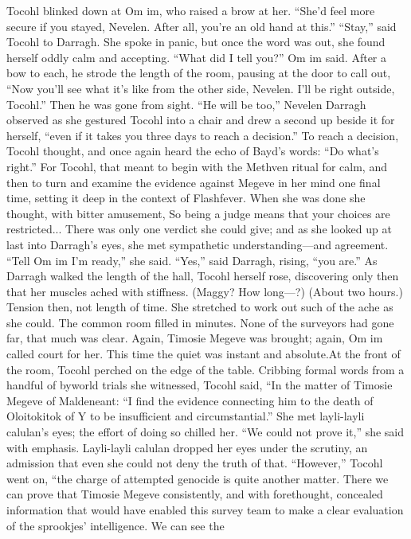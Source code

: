 \documentclass[9pt]{article}
\begin{document}
Tocohl blinked down at Om im, who raised a brow at her. “She’d feel more secure if you stayed,
Nevelen. After all, you’re an old hand at this.”
“Stay,” said Tocohl to Darragh. She spoke in panic, but once the word was out, she found herself
oddly calm and accepting.
“What did I tell you?” Om im said. After a bow to each, he strode the length of the room, pausing at
the door to call out, “Now you’ll see what it’s like from the other side, Nevelen. I’ll be right outside,
Tocohl.” Then he was gone from sight.
“He will be too,” Nevelen Darragh observed as she gestured Tocohl into a chair and drew a second
up beside it for herself, “even if it takes you three days to reach a decision.”
To reach a decision, Tocohl thought, and once again heard the echo of Bayd’s words: “Do what’s
right.”
For Tocohl, that meant to begin with the Methven ritual for calm, and then to turn and examine the
evidence against Megeve in her mind one final time, setting it deep in the context of Flashfever. When she
was done she thought, with bitter amusement, So being a judge means that your choices are restricted...
There was only one verdict she could give; and as she looked up at last into Darragh’s eyes, she met
sympathetic understanding—and agreement. “Tell Om im I’m ready,” she said.
“Yes,” said Darragh, rising, “you are.”
As Darragh walked the length of the hall, Tocohl herself rose, discovering only then that her muscles
ached with stiffness. (Maggy? How long—?) (About two hours.) Tension then, not length of time. She
stretched to work out such of the ache as she could.
The common room filled in minutes. None of the surveyors had gone far, that much was clear. Again,
Timosie Megeve was brought; again, Om im called court for her. This time the quiet was instant and
absolute.At the front of the room, Tocohl perched on the edge of the table. Cribbing formal words from a
handful of byworld trials she witnessed, Tocohl said, “In the matter of Timosie Megeve of Maldeneant:
“I find the evidence connecting him to the death of Oloitokitok of Y to be insufficient and
circumstantial.” She met layli-layli calulan’s eyes; the effort of doing so chilled her. “We could not
prove it,” she said with emphasis. Layli-layli calulan dropped her eyes under the scrutiny, an admission
that even she could not deny the truth of that.
“However,” Tocohl went on, “the charge of attempted genocide is quite another matter. There we
can prove that Timosie Megeve consistently, and with forethought, concealed information that would
have enabled this survey team to make a clear evaluation of the sprookjes’ intelligence. We can see the
\end{document}
